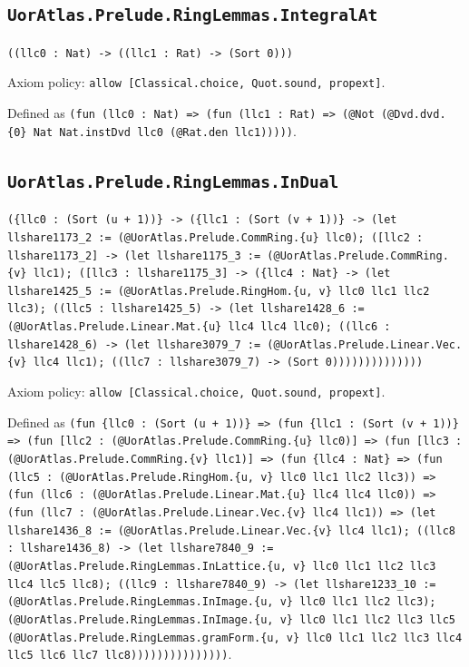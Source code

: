 \documentclass[11pt]{article}
\begin{document}
\subsection*{\texttt{UorAtlas.Prelude.RingLemmas.IntegralAt}}
\noindent\texttt{((llc0 : Nat) -> ((llc1 : Rat) -> (Sort 0)))}\par
\noindent Axiom policy: \texttt{allow [Classical.choice, Quot.sound, propext]}.\par
\noindent Defined as \texttt{(fun (llc0 : Nat) => (fun (llc1 : Rat) => (@Not (@Dvd.dvd.\{0\} Nat Nat.instDvd llc0 (@Rat.den llc1)))))}.\par
\subsection*{\texttt{UorAtlas.Prelude.RingLemmas.InDual}}
\noindent\texttt{(\{llc0 : (Sort (u + 1))\} -> (\{llc1 : (Sort (v + 1))\} -> (let llshare1173\_2 := (@UorAtlas.Prelude.CommRing.\{u\} llc0); ([llc2 : llshare1173\_2] -> (let llshare1175\_3 := (@UorAtlas.Prelude.CommRing.\{v\} llc1); ([llc3 : llshare1175\_3] -> (\{llc4 : Nat\} -> (let llshare1425\_5 := (@UorAtlas.Prelude.RingHom.\{u, v\} llc0 llc1 llc2 llc3); ((llc5 : llshare1425\_5) -> (let llshare1428\_6 := (@UorAtlas.Prelude.Linear.Mat.\{u\} llc4 llc4 llc0); ((llc6 : llshare1428\_6) -> (let llshare3079\_7 := (@UorAtlas.Prelude.Linear.Vec.\{v\} llc4 llc1); ((llc7 : llshare3079\_7) -> (Sort 0))))))))))))))}\par
\noindent Axiom policy: \texttt{allow [Classical.choice, Quot.sound, propext]}.\par
\noindent Defined as \texttt{(fun \{llc0 : (Sort (u + 1))\} => (fun \{llc1 : (Sort (v + 1))\} => (fun [llc2 : (@UorAtlas.Prelude.CommRing.\{u\} llc0)] => (fun [llc3 : (@UorAtlas.Prelude.CommRing.\{v\} llc1)] => (fun \{llc4 : Nat\} => (fun (llc5 : (@UorAtlas.Prelude.RingHom.\{u, v\} llc0 llc1 llc2 llc3)) => (fun (llc6 : (@UorAtlas.Prelude.Linear.Mat.\{u\} llc4 llc4 llc0)) => (fun (llc7 : (@UorAtlas.Prelude.Linear.Vec.\{v\} llc4 llc1)) => (let llshare1436\_8 := (@UorAtlas.Prelude.Linear.Vec.\{v\} llc4 llc1); ((llc8 : llshare1436\_8) -> (let llshare7840\_9 := (@UorAtlas.Prelude.RingLemmas.InLattice.\{u, v\} llc0 llc1 llc2 llc3 llc4 llc5 llc8); ((llc9 : llshare7840\_9) -> (let llshare1233\_10 := (@UorAtlas.Prelude.RingLemmas.InImage.\{u, v\} llc0 llc1 llc2 llc3); (@UorAtlas.Prelude.RingLemmas.InImage.\{u, v\} llc0 llc1 llc2 llc3 llc5 (@UorAtlas.Prelude.RingLemmas.gramForm.\{u, v\} llc0 llc1 llc2 llc3 llc4 llc5 llc6 llc7 llc8)))))))))))))))}.\par
\end{document}
